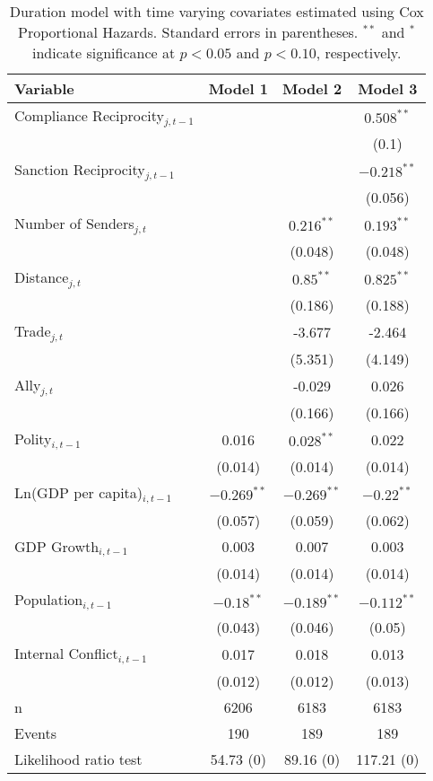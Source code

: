 \begin{table}[ht]
\centering
{\normalsize
\begin{tabular}{lccc}
 Variable & Model 1 & Model 2 & Model 3 \\ 
  \hline
\hline
Compliance Reciprocity$_{j,t-1}$ &  &  & $0.508^{\ast\ast}$ \\ 
   &  &  & (0.1) \\ 
  Sanction Reciprocity$_{j,t-1}$ &  &  & $-0.218^{\ast\ast}$ \\ 
   &  &  & (0.056) \\ 
   \hline
Number of Senders$_{j,t}$ &  & $0.216^{\ast\ast}$ & $0.193^{\ast\ast}$ \\ 
   &  & (0.048) & (0.048) \\ 
  Distance$_{j,t}$ &  & $0.85^{\ast\ast}$ & $0.825^{\ast\ast}$ \\ 
   &  & (0.186) & (0.188) \\ 
  Trade$_{j,t}$ &  & -3.677 & -2.464 \\ 
   &  & (5.351) & (4.149) \\ 
  Ally$_{j,t}$ &  & -0.029 & 0.026 \\ 
   &  & (0.166) & (0.166) \\ 
   \hline
Polity$_{i,t-1}$ & 0.016 & $0.028^{\ast\ast}$ & 0.022 \\ 
   & (0.014) & (0.014) & (0.014) \\ 
  Ln(GDP per capita)$_{i,t-1}$ & $-0.269^{\ast\ast}$ & $-0.269^{\ast\ast}$ & $-0.22^{\ast\ast}$ \\ 
   & (0.057) & (0.059) & (0.062) \\ 
  GDP Growth$_{i,t-1}$ & 0.003 & 0.007 & 0.003 \\ 
   & (0.014) & (0.014) & (0.014) \\ 
  Population$_{i,t-1}$ & $-0.18^{\ast\ast}$ & $-0.189^{\ast\ast}$ & $-0.112^{\ast\ast}$ \\ 
   & (0.043) & (0.046) & (0.05) \\ 
  Internal Conflict$_{i,t-1}$ & 0.017 & 0.018 & 0.013 \\ 
   & (0.012) & (0.012) & (0.013) \\ 
   \hline
n & 6206 & 6183 & 6183 \\ 
  Events & 190 & 189 & 189 \\ 
  Likelihood ratio test & 54.73 (0) & 89.16 (0) & 117.21 (0) \\ 
   \hline
\hline
\end{tabular}
}
\caption{Duration model with time varying covariates estimated using Cox Proportional Hazards. Standard errors in parentheses. $^{**}$ and $^{*}$ indicate significance at $p< 0.05 $ and $p< 0.10 $, respectively.} 
\label{tab:regResults}
\end{table}
